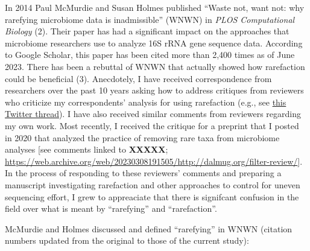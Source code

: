 \documentclass[
]{article}
\begin{document}
In 2014 Paul McMurdie and Susan Holmes published ``Waste not, want not:
why rarefying microbiome data is inadmissible'' (WNWN) in \emph{PLOS
Computational Biology} (2). Their paper has had a significant impact on
the approaches that microbiome researchers use to analyze 16S rRNA gene
sequence data. According to Google Scholar, this paper has been cited
more than 2,400 times as of June 2023. There has been a rebuttal of WNWN
that actually showed how rarefaction could be beneficial (3).
Anecdotely, I have received correspondence from researchers over the
past 10 years asking how to address critiques from reviewers who
criticize my correspondents' analysis for using rarefaction (e.g., see
\href{https://twitter.com/inanna_nalytica/status/1264299305067786242}{this
Twitter thread}). I have also received similar comments from reviewers
regarding my own work. Most recently, I received the critique for a
preprint that I posted in 2020 that analyzed the practice of removing
rare taxa from microbiome analyses {[}see comments linked to
\textbf{XXXXX};
\url{https://web.archive.org/web/20230308191505/http://dalmug.org/filter-review/}{]}.
In the process of responding to these reviewers' comments and preparing
a manuscript investigating rarefaction and other approaches to control
for uneven sequencing effort, I grew to appreaciate that there is
signifcant confusion in the field over what is meant by ``rarefying''
and ``rarefaction''.

McMurdie and Holmes discussed and defined ``rarefying'' in WNWN
(citation numbers updated from the original to those of the current
study):
\end{document}
